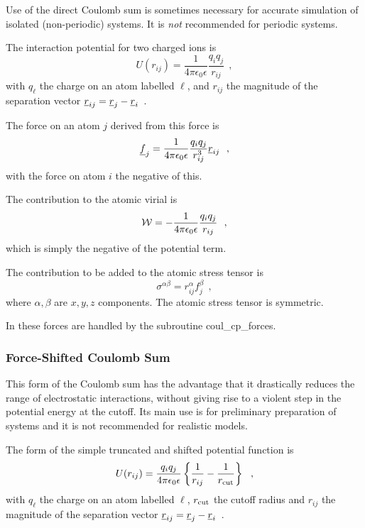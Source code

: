 Use of the direct Coulomb sum is
sometimes necessary for accurate simulation of isolated
(non-periodic) systems.  It is {\em not} recommended for periodic
systems.

The interaction potential for two charged ions is
\begin{equation}
U(r_{ij}) = \frac{1}{4\pi\epsilon_{0}\epsilon}\frac{q_{i}q_{j}}{r_{ij}}~~,
\end{equation}
with $q_{\ell}$ the charge on an atom labelled $\ell$, and
$r_{ij}$ the magnitude of the separation vector
$\mbox{$\underline{r}$}_{ij}=\mbox{$\underline{r}$}_{j}-\mbox{$\underline{r}$}_{i}$~.

The force on an atom $j$ derived from this force is
\begin{equation}
\mbox{$\underline{f}$}_{j} = \frac{1}{4\pi\epsilon_{0}\epsilon} \frac{q_{i}q_{j}}{r_{ij}^{3}} \mbox{$\underline{r}$}_{ij}~~,
\end{equation}
with the force on atom $i$ the negative of this.

The contribution to the atomic virial is
\begin{equation}
{\cal W} = -\frac{1}{4\pi\epsilon_{0}\epsilon} \frac{q_{i}q_{j}}{r_{ij}}~~,
\end{equation}
which is simply the negative of the potential term.

The contribution to be added to the atomic stress tensor is
\begin{equation}
\sigma^{\alpha \beta} = r_{ij}^{\alpha} f_{j}^{\beta}~~,
\end{equation}
where $\alpha,\beta$ are $x,y,z$ components.  The atomic
stress tensor is symmetric.

In \D these forces are handled by the subroutine {\sc
coul\_cp\_forces}.

\subsubsection{Force-Shifted Coulomb Sum}

This form of the Coulomb sum has the advantage that it drastically
reduces the range of electrostatic interactions, without giving
rise to a violent step in the potential energy at the cutoff.  Its
main use is for preliminary preparation of systems and it is not
recommended for realistic models.

The form of the simple truncated and shifted potential function is
\begin{equation}
U(r_{ij}) = \frac{q_{i}q_{j}}{4\pi\epsilon_{0}\epsilon}
\left\{\frac{1}{r_{ij}} - \frac{1}{r_{\rm cut}}\right\}~~,
\end{equation}
with $q_{\ell}$ the charge on an atom labelled $\ell$, $r_{\rm cut}$
the cutoff radius and $r_{ij}$ the magnitude of the separation
vector $\mbox{$\underline{r}$}_{ij}=\mbox{$\underline{r}$}_{j}-\mbox{$\underline{r}$}_{i}$~.

